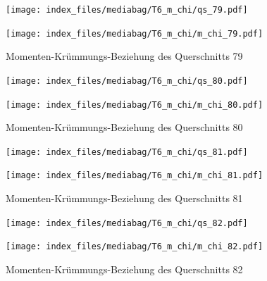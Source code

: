 \documentclass[
  11pt,
  letterpaper,
]{scrreprt}
\begin{document}
\begin{figure}[H]

\begin{minipage}{0.50\linewidth}
\texttt{[image: index\_files/mediabag/T6\_m\_chi/qs\_79.pdf]}\end{minipage}%
%
\begin{minipage}{0.50\linewidth}
\texttt{[image: index\_files/mediabag/T6\_m\_chi/m\_chi\_79.pdf]}\end{minipage}%

\caption{\label{fig-m_chi_appendix}Momenten-Krümmungs-Beziehung des
Querschnitts 79}

\end{figure}%

\begin{figure}[H]

\begin{minipage}{0.50\linewidth}
\texttt{[image: index\_files/mediabag/T6\_m\_chi/qs\_80.pdf]}\end{minipage}%
%
\begin{minipage}{0.50\linewidth}
\texttt{[image: index\_files/mediabag/T6\_m\_chi/m\_chi\_80.pdf]}\end{minipage}%

\caption{\label{fig-m_chi_appendix}Momenten-Krümmungs-Beziehung des
Querschnitts 80}

\end{figure}%

\begin{figure}[H]

\begin{minipage}{0.50\linewidth}
\texttt{[image: index\_files/mediabag/T6\_m\_chi/qs\_81.pdf]}\end{minipage}%
%
\begin{minipage}{0.50\linewidth}
\texttt{[image: index\_files/mediabag/T6\_m\_chi/m\_chi\_81.pdf]}\end{minipage}%

\caption{\label{fig-m_chi_appendix}Momenten-Krümmungs-Beziehung des
Querschnitts 81}

\end{figure}%

\begin{figure}[H]

\begin{minipage}{0.50\linewidth}
\texttt{[image: index\_files/mediabag/T6\_m\_chi/qs\_82.pdf]}\end{minipage}%
%
\begin{minipage}{0.50\linewidth}
\texttt{[image: index\_files/mediabag/T6\_m\_chi/m\_chi\_82.pdf]}\end{minipage}%

\caption{\label{fig-m_chi_appendix}Momenten-Krümmungs-Beziehung des
Querschnitts 82}

\end{figure}%
\end{document}
